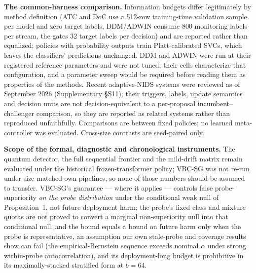 \documentclass[journal]{IEEEtran}
\begin{document}
\textbf{The common-harness comparison.} Information budgets differ legitimately by method definition (ATC and DoC use a 512-row training-time validation sample per model and zero target labels, DDM/ADWIN consume 800 monitoring labels per stream, the gates 32 target labels per decision) and are reported rather than equalized; policies with probability outputs train Platt-calibrated SVCs, which leaves the classifiers' predictions unchanged. DDM and ADWIN were run at their registered reference parameters and were not tuned; their cells characterize that configuration, and a parameter sweep would be required before reading them as properties of the methods. Recent adaptive-NIDS systems were reviewed as of September 2026 (Supplementary \S S11); their triggers, labels, update semantics and decision units are not decision-equivalent to a per-proposal incumbent--challenger comparison, so they are reported as related systems rather than reproduced unfaithfully. Comparisons are between fixed policies; no learned meta-controller was evaluated. Cross-size contrasts are seed-paired only.

\textbf{Scope of the formal, diagnostic and chronological instruments.} The quantum detector, the full sequential frontier and the mild-drift matrix remain evaluated under the historical frozen-transformer policy; VBC-SG was not re-run under size-matched own pipelines, so none of those numbers should be assumed to transfer. VBC-SG's guarantee --- where it applies --- controls false probe-superiority \emph{on the probe distribution} under the conditional weak null of Proposition~1, not future deployment harm; the probe's fixed class and mixture quotas are not proved to convert a marginal non-superiority null into that conditional null, and the bound equals a bound on future harm only when the probe is representative, an assumption our own stale-probe and coverage results show can fail (the empirical-Bernstein sequence exceeds nominal $\alpha$ under strong within-probe autocorrelation), and its deployment-long budget is prohibitive in its maximally-stacked stratified form at $b{=}64$.
\end{document}
